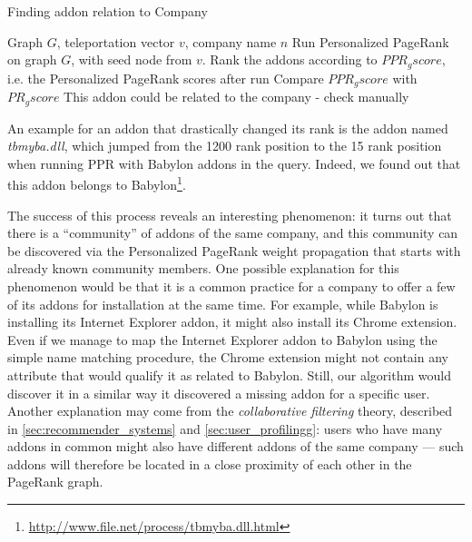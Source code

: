 \documentclass[11pt,oneside]{book}
\begin{document}
\begin{algorithm}[!t]
\caption{Finding addon relation to Company}
\label{alg:find_addon_species}
\begin{algorithmic}[1] 
\REQUIRE Graph $G$, teleportation vector $v$, company name $n$
\STATE Run Personalized PageRank on graph $G$, with seed node from $v$.
\STATE Rank the addons according to $PPR_gscore$, i.e. the Personalized PageRank scores after run
\STATE Compare $PPR_gscore$ with $PR_gscore$
\STATE This addon could be related to the company - check manually
\ENDIF
\ENDFOR
\end{algorithmic}
\end{algorithm}

An example for an addon that drastically changed its rank is the addon named \emph{tbmyba.dll}, which jumped from the 1200 rank position to the 15 rank position when running PPR with Babylon addons in the query. Indeed, we found out that this addon belongs to Babylon\footnote{\url{http://www.file.net/process/tbmyba.dll.html}}.

The success of this process reveals an interesting phenomenon: it turns out that there is a ``community'' of addons of the same company, and this community can be discovered via the Personalized PageRank weight propagation that starts with already known community members. One possible explanation for this phenomenon would be that it is a common practice for a company to offer a few of its addons for installation at the same time. For example, while Babylon is installing its Internet Explorer addon, it might also install its Chrome extension. Even if we manage to map the Internet Explorer addon to Babylon using the simple name matching procedure, the Chrome extension might not contain any attribute that would qualify it as related to Babylon. Still, our algorithm would discover it in a similar way it discovered a missing addon for a specific user. 
Another explanation may come from the \emph{collaborative filtering} theory, described in \autoref{sec:recommender_systems} and \autoref{sec:user_profilingg}: users who have many addons in common might also have different addons of the same company --- such addons will therefore be located in a close proximity of each other in the PageRank graph.
\end{document}
